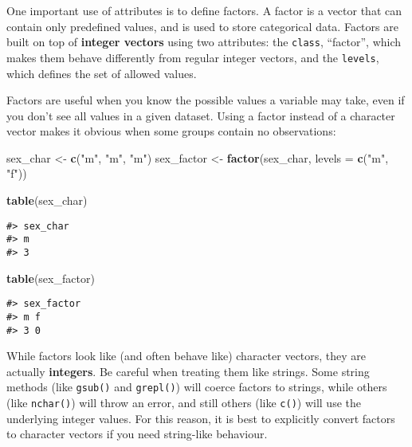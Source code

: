 \documentclass[]{book}
\newenvironment{Shaded}{\begin{snugshade}}{\end{snugshade}}
\newcommand{\KeywordTok}[1]{\textcolor[rgb]{0.13,0.29,0.53}{\textbf{#1}}}
\newcommand{\DataTypeTok}[1]{\textcolor[rgb]{0.13,0.29,0.53}{#1}}
\newcommand{\StringTok}[1]{\textcolor[rgb]{0.31,0.60,0.02}{#1}}
\newcommand{\NormalTok}[1]{#1}
\theoremstyle{definition}
\theoremstyle{definition}
\theoremstyle{definition}
\theoremstyle{remark}
\begin{document}
One important use of attributes is to define factors. A factor is a
vector that can contain only predefined values, and is used to store
categorical data. Factors are built on top of \textbf{integer vectors}
using two attributes: the \texttt{class}, ``factor'', which makes them
behave differently from regular integer vectors, and the
\texttt{levels}, which defines the set of allowed values.

Factors are useful when you know the possible values a variable may
take, even if you don't see all values in a given dataset. Using a
factor instead of a character vector makes it obvious when some groups
contain no observations:

\begin{Shaded}
\begin{Highlighting}[]
\NormalTok{sex_char <-}\StringTok{ }\KeywordTok{c}\NormalTok{(}\StringTok{"m"}\NormalTok{, }\StringTok{"m"}\NormalTok{, }\StringTok{"m"}\NormalTok{)}
\NormalTok{sex_factor <-}\StringTok{ }\KeywordTok{factor}\NormalTok{(sex_char, }\DataTypeTok{levels =} \KeywordTok{c}\NormalTok{(}\StringTok{"m"}\NormalTok{, }\StringTok{"f"}\NormalTok{))}

\KeywordTok{table}\NormalTok{(sex_char)}
\end{Highlighting}
\end{Shaded}

\begin{verbatim}
#> sex_char
#> m 
#> 3
\end{verbatim}

\begin{Shaded}
\begin{Highlighting}[]
\KeywordTok{table}\NormalTok{(sex_factor)}
\end{Highlighting}
\end{Shaded}

\begin{verbatim}
#> sex_factor
#> m f 
#> 3 0
\end{verbatim}

While factors look like (and often behave like) character vectors, they
are actually \textbf{integers}. Be careful when treating them like
strings. Some string methods (like \texttt{gsub()} and \texttt{grepl()})
will coerce factors to strings, while others (like \texttt{nchar()})
will throw an error, and still others (like \texttt{c()}) will use the
underlying integer values. For this reason, it is best to explicitly
convert factors to character vectors if you need string-like behaviour.
\end{document}
